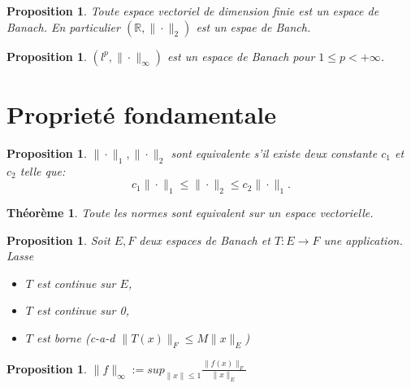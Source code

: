 \documentclass[a4paper, 12pt, french]{report}
\theoremstyle{break}
\newtheorem{prop}[defin]{Proposition}
\newtheorem{theo}[defin]{Théorème}
\begin{document}
\begin{prop}
    Toute espace vectoriel de dimension finie est un espace de Banach. En particulier $(\mathbb{R}, \| \cdot \|_{2})$ est un espae de Banch.
\end{prop}

\begin{prop}
    $(l^{p}, \| \cdot \|_{\infty})$ est un espace de Banach pour $1 \leq p< +\infty$.
\end{prop}

\section{Proprieté fondamentale}
\begin{prop}
    $\| \cdot \|_{1}, \| \cdot \|_{2}$ sont equivalente s'il existe deux constante $c_{1}$ et $c_{2}$ telle que: $$c_{1}\| \cdot \|_{1} \leq \| \cdot \|_{2} \leq c_{2}\| \cdot \|_{1}.$$
\end{prop}

\begin{theo}
    Toute les normes sont equivalent sur un espace vectorielle.
\end{theo}

\begin{prop}
    Soit $E, F$ deux espaces de Banach et $T: E \rightarrow F$ une application. Lasse 
    \begin{itemize}
        \item $T$ est continue sur $E$,
        \item $T$ est continue sur 0,
        \item $T$ est borne (c-a-d $\|T(x)\|_{F} \leq M \|x\|_{E}$)
    \end{itemize}
\end{prop}

\begin{prop}
    $\|f\|_{\infty} :=  sup_{\|x\| \leq 1} \frac{\|f(x)\|_{F}}{\|x\|_{E}}$
\end{prop}
\end{document}

